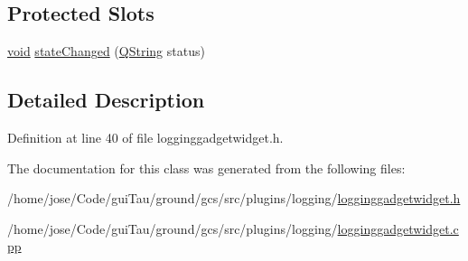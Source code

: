 \subsection*{Protected Slots}
\begin{DoxyCompactItemize}
\item 
\hyperlink{group___u_a_v_objects_plugin_ga444cf2ff3f0ecbe028adce838d373f5c}{void} \hyperlink{group___g_c_s_control_gadget_plugin_ga8d9370f949bfe6eec4f37676feb6de85}{state\-Changed} (\hyperlink{group___u_a_v_objects_plugin_gab9d252f49c333c94a72f97ce3105a32d}{Q\-String} status)
\end{DoxyCompactItemize}


\subsection{Detailed Description}


Definition at line 40 of file logginggadgetwidget.\-h.



The documentation for this class was generated from the following files\-:\begin{DoxyCompactItemize}
\item 
/home/jose/\-Code/gui\-Tau/ground/gcs/src/plugins/logging/\hyperlink{logginggadgetwidget_8h}{logginggadgetwidget.\-h}\item 
/home/jose/\-Code/gui\-Tau/ground/gcs/src/plugins/logging/\hyperlink{logginggadgetwidget_8cpp}{logginggadgetwidget.\-cpp}\end{DoxyCompactItemize}
